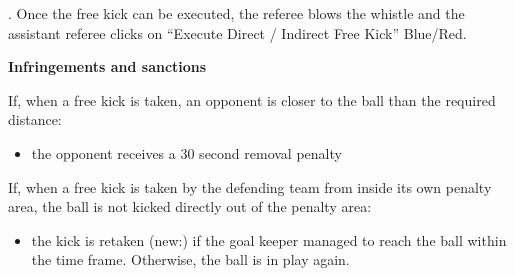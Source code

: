 .
Once the free kick can be executed, the referee blows the whistle and the assistant
referee clicks on ``Execute Direct / Indirect Free Kick'' Blue/Red.

\bigskip

{\bfseries Infringements and sanctions}

\headlinebox

If, when a free kick is taken, an opponent is closer to the ball than the required distance:

\begin{itemize}
\item the opponent receives a 30 second removal penalty 
\end{itemize}

If, when a free kick is taken by the defending team from inside its own penalty area, the ball is not kicked directly out of the penalty area:


\begin{itemize}
\item the kick is retaken (new:) if the goal keeper managed to reach the ball within the time frame. Otherwise, the ball is in play again.
\end{itemize}

\bigskip

